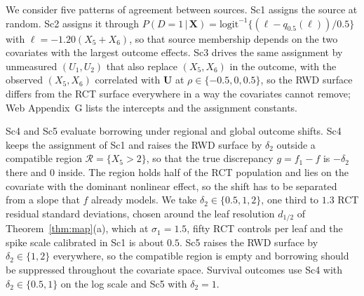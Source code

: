 \documentclass[11pt]{article}
\newcommand{\logit}{\mathrm{logit}}
\newcommand{\given}{\,\vert\,}
\theoremstyle{definition}
\theoremstyle{plain}
\begin{document}
We consider five patterns of agreement between sources. Sc1 assigns the source at random. Sc2 assigns it through $P(D=1\given\bm X)=\logit^{-1}\{(\ell-q_{0.5}(\ell))/0.5\}$ with $\ell=-1.20(X_5+X_6)$, so that source membership depends on the two covariates with the largest outcome effects. Sc3 drives the same assignment by unmeasured $(U_1,U_2)$ that also replace $(X_5,X_6)$ in the outcome, with the observed $(X_5,X_6)$ correlated with $\bm U$ at $\rho\in\{-0.5,0,0.5\}$, so the RWD surface differs from the RCT surface everywhere in a way the covariates cannot remove; Web Appendix~G lists the intercepts and the assignment constants.

Sc4 and Sc5 evaluate borrowing under regional and global outcome shifts. Sc4 keeps the assignment of Sc1 and raises the RWD surface by $\delta_2$ outside a compatible region $\mathcal R=\{X_5>2\}$, so that the true discrepancy $g=f_1-f$ is $-\delta_2$ there and $0$ inside. The region holds half of the RCT population and lies on the covariate with the dominant nonlinear effect, so the shift has to be separated from a slope that $f$ already models. We take $\delta_2\in\{0.5,1,2\}$, one third to $1.3$ RCT residual standard deviations, chosen around the leaf resolution $d_{1/2}$ of Theorem~\ref{thm:map}(a), which at $\sigma_1=1.5$, fifty RCT controls per leaf and the spike scale calibrated in Sc1 is about $0.5$. Sc5 raises the RWD surface by $\delta_2\in\{1,2\}$ everywhere, so the compatible region is empty and borrowing should be suppressed throughout the covariate space. Survival outcomes use Sc4 with $\delta_2\in\{0.5,1\}$ on the log scale and Sc5 with $\delta_2=1$.
\end{document}
